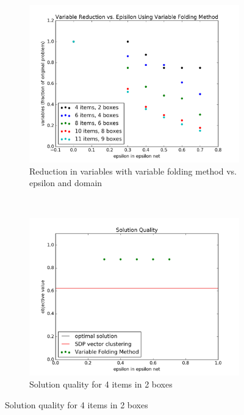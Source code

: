\documentclass[11pt]{article} %
\begin{document}
\begin{figure}[h!]
\centering
	\begin{subfigure}[b]{0.45\textwidth}
	\centering
	\includegraphics[width=\textwidth]{variables_epsilon_pigeon}
	\caption{Reduction in variables with variable folding method vs. epsilon and domain}
	\label{pigeon-reduction}
	\end{subfigure}
	~
	\begin{subfigure}[b]{0.45\textwidth}
	\centering
	\includegraphics[width=\textwidth]{solution_epsilon_n4m2}
	\caption{Solution quality for 4 items in 2 boxes}
	\label{n4m2}
	\end{subfigure}


\end{figure}
\end{document}
